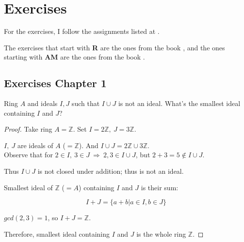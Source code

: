 \documentclass{article}
\theoremstyle{definition}
\newenvironment{ex}[1]
{\renewcommand\theinnerex{#1}\innerex}
{\endinnerex}
\begin{document}

\newpage

\section{Exercises}

For the exercises, I follow the assignments listed at \cite{mit-course}.

The exercises that start with \textbf{R} are the ones from the book \cite{reid}, and the ones starting with \textbf{AM} are the ones from the book \cite{am}.

\subsection{Exercises Chapter 1}

\begin{ex}{R.1.1}
  Ring $A$ and ideals $I, J$ such that $I \cup J$ is not an ideal. What's the smallest ideal containing $I$ and $J$?
\end{ex}
\begin{proof}
  Take ring $A= \mathbb{Z}$. Set $I = 2 \mathbb{Z},~ J=3 \mathbb{Z}$.

  $I,~J$ are ideals of $A$ ($=\mathbb{Z}$). And $I \cup J = 2 \mathbb{Z} \cup 3 \mathbb{Z}$.\\
  Observe that for $2 \in I,~ 3 \in J ~\Longrightarrow~ 2,3 \in I \cup J$, but $2+3 = 5 \not\in I \cup J$.

  Thus $I \cup J$ is not closed under addition; thus is not an ideal.


  Smallest ideal of $\mathbb{Z}$ ($=A$) containing $I$ and $J$ is their sum:

  $$I+J = \{ a+b | a \in I, b \in J \}$$

  $gcd(2,3)=1$, so $I+J = \mathbb{Z}$.

  Therefore, smallest ideal containing $I$ and $J$ is the whole ring $\mathbb{Z}$.
\end{proof}
\end{document}
